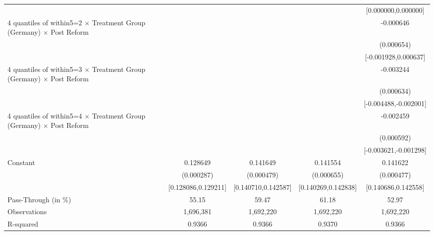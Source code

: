 {\begin{tabular}{l*{4}{c}}
                    &                     &                     &                     &[0.000000,0.000000]         \\
4 quantiles of within5=2 $\times$ Treatment Group (Germany) $\times$ Post Reform&                     &                     &                     &   -0.000646         \\
                    &                     &                     &                     &  (0.000654)         \\
                    &                     &                     &                     &[-0.001928,0.000637]         \\
4 quantiles of within5=3 $\times$ Treatment Group (Germany) $\times$ Post Reform&                     &                     &                     &   -0.003244\sym{***}\\
                    &                     &                     &                     &  (0.000634)         \\
                    &                     &                     &                     &[-0.004488,-0.002001]         \\
4 quantiles of within5=4 $\times$ Treatment Group (Germany) $\times$ Post Reform&                     &                     &                     &   -0.002459\sym{***}\\
                    &                     &                     &                     &  (0.000592)         \\
                    &                     &                     &                     &[-0.003621,-0.001298]         \\
Constant            &    0.128649\sym{***}&    0.141649\sym{***}&    0.141554\sym{***}&    0.141622\sym{***}\\
                    &  (0.000287)         &  (0.000479)         &  (0.000655)         &  (0.000477)         \\
                    &[0.128086,0.129211]         &[0.140710,0.142587]         &[0.140269,0.142838]         &[0.140686,0.142558]         \\
\midrule
Pass-Through (in \%)&       55.15         &       59.47         &       61.18         &       52.97         \\
Observations        &   1,696,381         &   1,692,220         &   1,692,220         &   1,692,220         \\
R-squared           &      0.9366         &      0.9366         &      0.9370         &      0.9366         \\
\bottomrule
\end{tabular}
}
